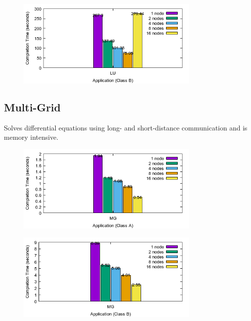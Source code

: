 \documentclass[a4paper]{article}
\begin{document}
\begin{figure}[H]
\centering
\includegraphics[width=0.8\textwidth]{figures/LUvB.png}
\caption{\label{fig:LUvB}}
\end{figure}

\subsection{Multi-Grid}

Solves differential equations using long- and short-distance communication and is memory intensive.

\begin{figure}[H]
\centering
\includegraphics[width=0.8\textwidth]{figures/MGvA.png}
\caption{\label{fig:MGvA}}
\end{figure}

\begin{figure}[H]
\centering
\includegraphics[width=0.8\textwidth]{figures/MGvB.png}
\caption{\label{fig:MGvB}}
\end{figure}



\end{document}
